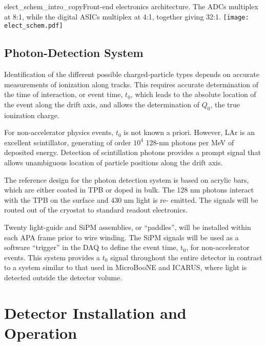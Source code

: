 \begin{cdrfigure}{elect_schem_intro_copy}{Front-end electronics architecture. The ADCs multiplex at 8:1, while the digital ASICs multiplex at 4:1, together giving 32:1.}
\texttt{[image: elect\_schem.pdf]}
\end{cdrfigure}


\subsection{Photon-Detection System}

Identification of the different possible charged-particle types 
depends on accurate measurements of ionization along tracks. This requires accurate determination
of the time of interaction, or event time, $t_0$, which leads to the absolute location 
of the event along the drift axis, and allows the determination of $Q_0$,  the 
true ionization charge.

For non-accelerator physics events, $t_0$ is not known a priori.  
However, LAr is an excellent scintillator, generating of 
order $10^{4}$ 128-nm photons per MeV of deposited energy.  
Detection of scintillation photons 
provides a prompt signal that allows unambiguous 
location of particle positions along the drift axis.

The reference design for the photon detection system is based on acrylic bars, which are either coated in 
TPB or doped in bulk. The 128 nm photons interact with the TPB on the surface and 430 nm light is re-
emitted. The signals will be routed out of the cryostat to standard readout electronics.

Twenty light-guide and SiPM assemblies, or ``paddles'', will be installed within each APA frame prior to wire winding. The SiPM signals will be used as a software ``trigger'' in the DAQ to define the event time, t$_0$, for non-accelerator events. This system provides a $t_0$ signal throughout the entire detector in contrast to a system similar to that used in MicroBooNE and ICARUS, where light is detected outside the detector volume. 

\section{Detector Installation and Operation}
\label{sec:det-install}

